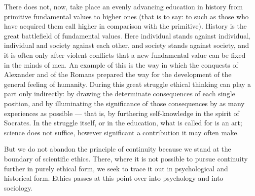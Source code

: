 \documentclass[12pt,a4paper]{book}
\newcommand{\opage}[1]{\marginnote{\footnotesize\textit{[#1]}}}
\begin{document}
There does not, now, take place an evenly advancing education in history from
primitive fundamental values to higher ones (that is to say: to such as those who
have acquired them call higher in comparison with the primitive). History is the
great battlefield of fundamental values. Here individual stands against
individual, individual and society against each other, and society stands against
society, and it is often only after violent conflicts that a new fundamental
value can be fixed in the minds of men. An example of this is the way in which
the conquests of Alexander and of the Romans prepared the way for the development
of the general feeling of humanity. During this great struggle ethical thinking
can play a part only indirectly: by drawing the determinate consequences of each
single position, and by illuminating the significance of those consequences by as
many experiences as possible --- that is, by furthering self-knowledge in the
spirit of Socrates. In the struggle itself, or in the education, what is called
for is an art; science does not suffice, however significant a contribution it
may often make.

But we do not abandon the principle of continuity because we stand at \opage{77}the
boundary of scientific ethics. There, where it is not possible to pursue
continuity further in purely ethical form, we seek to trace it out in
psychological and historical form. Ethics passes at this point over into
psychology and into sociology.
\end{document}
